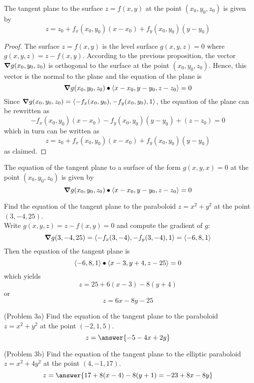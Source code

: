 \documentclass[handout]{ximera}
\begin{document}
\begin{theorem}
The tangent plane to the surface $z = f(x,y)$ at the point $(x_0, y_0, z_0)$ is given by
\[
z = z_0 + f_x(x_0, y_0)(x - x_0) + f_y(x_0, y_0)(y - y_0)
\]
\end{theorem}
\begin{proof}
The surface $z = f(x,y)$ is the level surface $g(x,y,z) = 0$ where $g(x,y,z) = z - f(x,y)$.
According to the previous proposition, the vector $\boldsymbol\nabla g(x_0, y_0, z_0)$ is orthogonal to the surface at the point $(x_0, y_0, z_0)$.
Hence, this vector is the normal to the plane and the equation of the plane is
\[
\boldsymbol\nabla g(x_0, y_0, z_0) \bullet \left\langle x- x_0, y-y_0, z-z_0\right\rangle = 0
\]
Since $\boldsymbol\nabla g(x_0, y_0, z_0) = \left\langle -f_x(x_0, y_0), -f_y(x_0, y_0), 1\right\rangle$, 
the equation of the plane can be rewritten as
\[
-f_x(x_0, y_0)(x-x_0) - f_y(x_0, y_0)(y-y_0) + (z-z_0) = 0
\]
which in turn can be written as
\[
z = z_0 + f_x(x_0, y_0)(x-x_0) + f_y(x_0, y_0)(y-y_0)
\]
as claimed.
\end{proof}

\begin{corollary}
The equation of the tangent plane to a surface of the form $g(x, y, x) = 0$ at the point $(x_0, y_0, z_0)$ is given by
\[
\boldsymbol\nabla g(x_0, y_0, z_0) \bullet \left\langle x - x_0, y - y_0, z - z_0\right\rangle = 0
\]
\end{corollary}

\begin{example}[Example 3]
Find the equation of the tangent plane to the paraboloid $z = x^2 + y^2$ at the point $(3, -4, 25)$.\\
Write $g(x, y, z) = z - f(x,y) = 0$ and compute the gradient of $g$:
\[
\boldsymbol\nabla g(3, -4, 25) = \left\langle -f_x(3, -4), -f_y(3, -4), 1\right\rangle = \left\langle -6, 8, 1\right\rangle
\]
Then the equation of the tangent plane is
\[
\left\langle -6, 8, 1\right\rangle \bullet \left\langle x-3, y+4, z-25\right\rangle = 0
\]
which yields
\[
z = 25 + 6(x-3) - 8(y+4)
\]
or
\[
z = 6x - 8y - 25
\]
\end{example}

\begin{problem}(Problem 3a)
Find the equation of the tangent plane to the paraboloid $z = x^2 + y^2$ at the point $(-2, 1, 5)$.\\
\[
z = \answer{-5-4x+2y}
\]

\end{problem}


\begin{problem}(Problem 3b)
Find the equation of the tangent plane to the elliptic paraboloid $z = x^2 + 4y^2$ at the point $(4, -1, 17)$.\\
\[
z = \answer{17 + 8(x-4) - 8(y+1) = -23 + 8x -8y}
\]
\end{problem}
\end{document}
